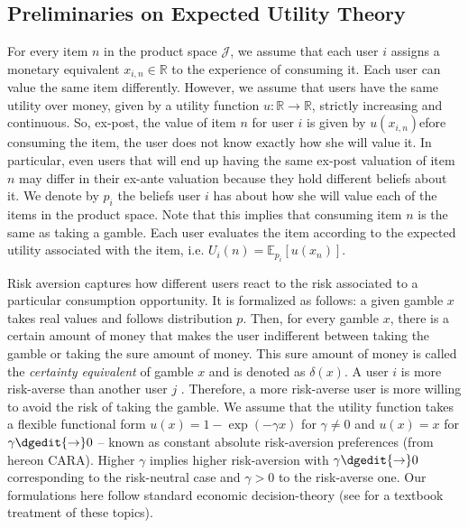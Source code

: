 \documentclass[manuscript]{acmart}
\begin{document}
\subsection{Preliminaries on Expected Utility Theory}
\noindent For every item $n$ in the product space $\mathcal J$, we assume that each user $i$ assigns a monetary equivalent $x_{i,n} \in \mathbb R$ to the experience of consuming it. Each user can value the same item differently. However, we assume that users have the same utility over money, given by a utility function $u: \mathbb R \to \mathbb R$, strictly increasing and continuous. So, ex-post, the value of item $n$ for user $i$ is given by $u(x_{i,n})$efore consuming the item, the user does not know exactly how she will value it. In particular, even users that will end up having the same ex-post valuation of item $n$ may differ in their ex-ante valuation because they hold different beliefs about it. We denote by $p_{i}$ the beliefs user $i$ has about how she will value each of the items in the product space. Note that this implies that consuming item $n$ is the same as taking a gamble. Each user evaluates the item according to the expected utility associated with the item, i.e. $U_i(n)=\mathbb E_{p_i}[u(x_n)]$. 
\par
Risk aversion captures how different users react to the risk associated to a particular consumption opportunity. It is formalized as follows: a given gamble $x$ takes real values and follows distribution $p$. Then, for every gamble $x$, there is a certain amount of money that makes the user indifferent between taking the gamble or taking the sure amount of money. This sure amount of money is called the \textit{certainty equivalent} of gamble $x$ and is denoted as $\delta(x)$. A user $i$ is more risk-averse than another user $j$ . Therefore, a more risk-averse user is more willing to avoid the risk of taking the gamble. We assume that the utility function takes a flexible functional form $u(x)=1-\exp(-\gamma x)$ for $\gamma\ne0$ and $u(x)=x$ for $\gamma\dgedit{\to}0$ -- known as constant absolute risk-aversion preferences (from hereon CARA). Higher $\gamma$ implies higher risk-aversion with $\gamma\dgedit{\to}0$ corresponding to the risk-neutral case and $\gamma>0$ to the risk-averse one. Our formulations here follow standard economic decision-theory (see \cite{mas1995microeconomic} for a textbook treatment of these topics).
\par
\end{document}
